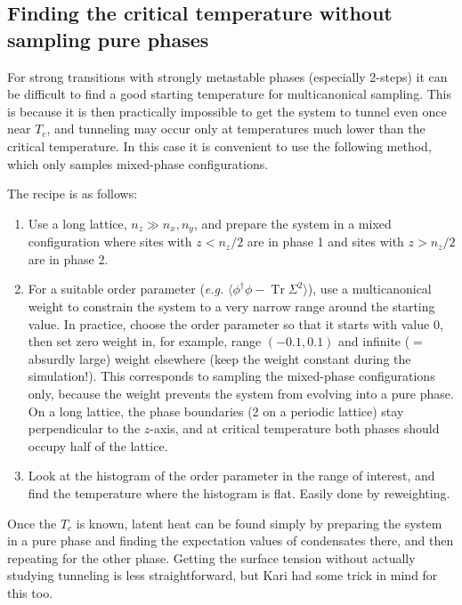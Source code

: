 \documentclass[11pt,a4paper]{article}
\newcommand\Tr{\operatorname{Tr}}
\begin{document}

\subsection{Finding the critical temperature without sampling pure phases}

For strong transitions with strongly metastable phases (especially 2-steps) it can be difficult to find a good starting temperature for multicanonical sampling. This is because it is then practically impossible to get the system to tunnel even once near $T_c$, and tunneling may occur only at temperatures much lower than the critical temperature. In this case it is convenient to use the following method, which only samples mixed-phase configurations.

The recipe is as follows:
\begin{enumerate}
	\item Use a long lattice, $n_z \gg n_x, n_y$, and prepare the system in a mixed configuration where sites with $z < n_z/2$ are in phase 1 and sites with $z > n_z/2$ are in phase 2. 
	
	\item For a suitable order parameter (\textit{e.g.} $\langle\phi^\dagger\phi - \Tr\Sigma^2\rangle$), use a multicanonical weight to constrain the system to a very narrow range around the starting value. In practice, choose the order parameter so that it starts with value 0, then set zero weight in, for example, range $(-0.1, 0.1)$ and infinite ($=$absurdly large) weight elsewhere (keep the weight constant during the simulation!). This corresponds to sampling the mixed-phase configurations only, because the weight prevents the system from evolving into a pure phase. On a long lattice, the phase boundaries (2 on a periodic lattice) stay perpendicular to the $z$-axis, and at critical temperature both phases should occupy half of the lattice.
	
	\item Look at the histogram of the order parameter in the range of interest, and find the temperature where the histogram is flat. Easily done by reweighting.
	
\end{enumerate}
Once the $T_c$ is known, latent heat can be found simply by preparing the system in a pure phase and finding the expectation values of condensates there, and then repeating for the other phase. Getting the surface tension without actually studying tunneling is less straightforward, but Kari had some trick in mind for this too.
\end{document}
